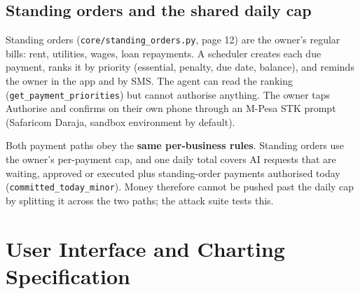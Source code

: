\documentclass[10pt,a4paper]{article}
\newcommand{\code}[1]{\texttt{\small #1}}
\begin{document}
\subsection{Standing orders and the shared daily cap}
\label{sec:standing}
Standing orders (\code{core/standing\_orders.py}, page 12) are the owner's regular bills: rent, utilities, wages, loan repayments. A scheduler creates each due payment, ranks it by priority (essential, penalty, due date, balance), and reminds the owner in the app and by SMS. The agent can read the ranking (\code{get\_payment\_priorities}) but cannot authorise anything. The owner taps Authorise and confirms on their own phone through an M-Pesa STK prompt (Safaricom Daraja, sandbox environment by default).

Both payment paths obey the \textbf{same per-business rules}. Standing orders use the owner's per-payment cap, and one daily total covers AI requests that are waiting, approved or executed plus standing-order payments authorised today (\code{committed\_today\_minor}). Money therefore cannot be pushed past the daily cap by splitting it across the two paths; the attack suite tests this.

\section{User Interface and Charting Specification}
\label{sec:charts}
\end{document}
